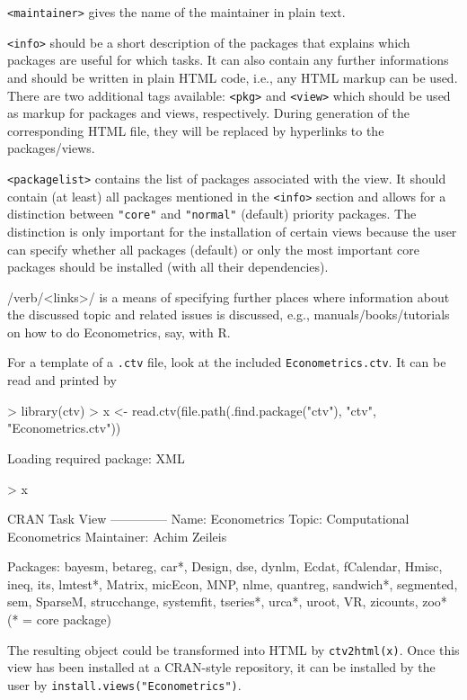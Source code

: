 \documentclass[a4paper]{article}
\begin{document}
\verb/<maintainer>/ gives the name of the maintainer in plain text.

\verb/<info>/ should be a short description of the packages that explains
which packages are useful for which tasks. It can also contain any further
informations and should be written in plain HTML code, i.e., any HTML markup
can be used. There are two additional tags available: \verb/<pkg>/ and 
\verb/<view>/ which should be used as markup for packages and views, respectively.
During generation of the corresponding HTML file, they will be replaced by
hyperlinks to the packages/views.

\verb/<packagelist>/ contains the list of packages associated with the view.
It should contain (at least) all packages mentioned in the \verb/<info>/ section
and allows for a distinction between \verb/"core"/ and \verb/"normal"/ (default)
priority packages. The distinction is only important for the installation of
certain views because the user can specify whether all packages (default) or only
the most important core packages should be installed (with all their dependencies).

/verb/<links>/ is a means of specifying further places where information about
the discussed topic and related issues is discussed, e.g., manuals/books/tutorials
on how to do Econometrics, say, with \textsf{R}.

For a template of a \verb/.ctv/ file, look at the included \verb/Econometrics.ctv/.
It can be read and printed by

\begin{Schunk}
\begin{Sinput}
> library(ctv)
> x <- read.ctv(file.path(.find.package("ctv"), "ctv", "Econometrics.ctv"))
\end{Sinput}
\begin{Soutput}
Loading required package: XML
\end{Soutput}
\begin{Sinput}
> x
\end{Sinput}
\begin{Soutput}
CRAN Task View
--------------
Name:       Econometrics
Topic:      Computational Econometrics
Maintainer: Achim Zeileis

Packages:   bayesm, betareg, car*, Design, dse, dynlm, Ecdat, fCalendar,
            Hmisc, ineq, its, lmtest*, Matrix, micEcon, MNP, nlme, quantreg,
            sandwich*, segmented, sem, SparseM, strucchange, systemfit,
            tseries*, urca*, uroot, VR, zicounts, zoo*
            (* = core package)
\end{Soutput}
\end{Schunk}

The resulting object could be transformed into HTML by \verb/ctv2html(x)/.
Once this view has been installed at a CRAN-style repository, it can be installed by
the user by \verb/install.views("Econometrics")/.
\end{document}
